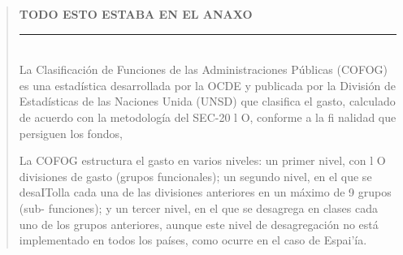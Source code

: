 \documentclass[10pt,a4paper]{article}
\newenvironment{specialblock}[1]{%
      \begin{quote} %
      \small %
      \noindent\textbf{#1}\\[-0.3em] %
      \rule{\linewidth}{0.4pt}\\[0.6em]}{
      \end{quote}}
\begin{document}
\begin{specialblock}{\textbf{TODO ESTO ESTABA EN EL ANAXO}}
    La Clasificación de Funciones de las Administraciones Públicas (COFOG) es una estadística desarrollada por la OCDE y publicada por la División de Estadísticas de las Naciones Unida (UNSD) que clasifica el gasto, calculado de acuerdo con la metodología del SEC-20 l O, conforme a la fi nalidad que persiguen los fondos,
    
    La COFOG estructura el gasto en varios niveles: un primer nivel, con l O divisiones de gasto (grupos funcionales); un segundo nivel, en el que se desaITolla cada una de las divisiones anteriores en un máximo de 9 grupos (sub- funciones); y un tercer nivel, en el que se desagrega en clases cada uno de los grupos anteriores, aunque este nivel de desagregación no está implementado en todos los países, como ocurre en el caso de Espai'ía.


\end{specialblock}
\end{document}
